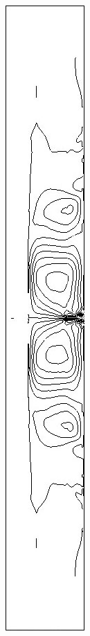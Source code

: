 \begin{figure}[h]
\begin{subfigure}[b]{0.15\textwidth}
\caption{ }
\end{subfigure}
\begin{subfigure}[b]{0.15\textwidth}
\centering
\includegraphics[width=\textwidth]{png/cranium/2d-sxy-01.png}

\end{subfigure}
\end{figure}
